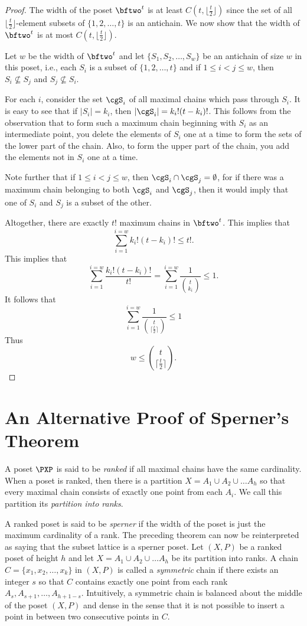 \begin{proof}
The width of the poset $\bftwo^t$ is at least
$C(t,\lfloor\frac{t}{2}\rfloor)$ since the set of all
$\lfloor\frac{t}{2}\rfloor$-element subsets of $\{1,2,\dots,t\}$ is an
antichain.  We now show that the width of $\bftwo^t$ is at most
$C(t,\lfloor\frac{t}{2}\rfloor)$.

Let $w$ be the width of $\bftwo^t$ and let $\{S_1,S_2,\dots, S_w\}$ be
an antichain of size $w$ in this poset, i.e., each $S_i$ is a subset
of $\{1,2,\dots,t\}$ and if $1\le i<j\le w$, then $S_i\nsubseteq
S_j$ and $S_j\nsubseteq S_i$.

For each $i$, consider the set $\cgS_i$ of all maximal chains which
pass through $S_i$.  It is easy to see that if $|S_i|=k_i$, then
$|\cgS_i|=k_i!(t-k_i)!$.  This follows from the observation that to
form such a maximum chain beginning with $S_i$ as an intermediate
point, you delete the elements of $S_i$ one at a time to form the
sets of the lower part of the chain.  Also, to form the upper part
of the chain, you add the elements not in $S_i$ one at a time.

Note further that if $1\le i <j\le w$, then $\cgS_i\cap \cgS_j
=\emptyset$, for if there was a maximum chain belonging to both
$\cgS_i$ and $\cgS_j$, then it would imply that one of $S_i$ and
$S_j$ is a subset of the other.

Altogether, there are exactly $t!$ maximum chains in $\bftwo^t$.  This
implies that
\[\sum_{i=1}^{i=w} k_i!(t-k_i)!\le t!.\]
This implies that
\[\sum_{i=1}^{i=w}\frac{k_i!(t-k_i)!}{t!}=
\sum_{i=1}^{i=w}\frac{1}{\binom{t}{k_i}}\le 1. 
\]
It follows that
\[
\sum_{i=1}^{i=w}\frac{1}{\binom{t}{\lceil\frac{t}{2}\rceil}}\le 1
\]
Thus
\[
w\le \binom{t}{\lceil\frac{t}{2}\rceil}.
\]
\end{proof}

\section{An Alternative Proof of Sperner's Theorem}

A poset $\PXP$ is said to be \textit{ranked} if all maximal
chains have the same cardinality.  When a poset is ranked,
then there is a partition $X=A_1\cup A_2\cup \dots A_h$
so that every maximal chain consists of exactly one point from
each $A_i$. We call this partition its \textit{partition into ranks}.

A ranked poset is said to be \textit{sperner} if the width of the
poset is just the maximum cardinality of a rank.  The preceding
theorem can now be reinterpreted as saying that the subset lattice is
a sperner poset.  Let $(X,P)$ be a ranked poset of height $h$ and let
$X= A_1\cup A_2\cup \dots A_h$ be its partition into ranks.  A chain
$C=\{x_1,x_2,\dots,x_k\}$ in $(X,P)$ is called a \textit{symmetric}
chain if there exists an integer $s$ so that $C$ contains exactly one
point from each rank $A_s,A_{s+1},\dots,A_{h+1-s}$.  Intuitively, a
symmetric chain is balanced about the middle of the poset $(X,P)$ and
dense in the sense that it is not possible to insert a point in
between two consecutive points in $C$.

